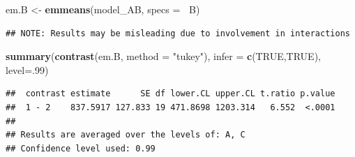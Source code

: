 \documentclass[12pt,]{article}
\newenvironment{Shaded}{\begin{snugshade}}{\end{snugshade}}
\newcommand{\KeywordTok}[1]{\textcolor[rgb]{0.13,0.29,0.53}{\textbf{#1}}}
\newcommand{\DataTypeTok}[1]{\textcolor[rgb]{0.13,0.29,0.53}{#1}}
\newcommand{\DecValTok}[1]{\textcolor[rgb]{0.00,0.00,0.81}{#1}}
\newcommand{\StringTok}[1]{\textcolor[rgb]{0.31,0.60,0.02}{#1}}
\newcommand{\OtherTok}[1]{\textcolor[rgb]{0.56,0.35,0.01}{#1}}
\newcommand{\OperatorTok}[1]{\textcolor[rgb]{0.81,0.36,0.00}{\textbf{#1}}}
\newcommand{\NormalTok}[1]{#1}
\begin{document}
\begin{Shaded}
\begin{Highlighting}[]
\NormalTok{em.B <-}\StringTok{ }\KeywordTok{emmeans}\NormalTok{(model_AB, }\DataTypeTok{specs =} \OperatorTok{~}\NormalTok{B)}
\end{Highlighting}
\end{Shaded}

\begin{verbatim}
## NOTE: Results may be misleading due to involvement in interactions
\end{verbatim}

\begin{Shaded}
\begin{Highlighting}[]
\KeywordTok{summary}\NormalTok{(}\KeywordTok{contrast}\NormalTok{(em.B, }\DataTypeTok{method =} \StringTok{"tukey"}\NormalTok{), }\DataTypeTok{infer =} \KeywordTok{c}\NormalTok{(}\OtherTok{TRUE}\NormalTok{,}\OtherTok{TRUE}\NormalTok{), }\DataTypeTok{level=}\NormalTok{.}\DecValTok{99}\NormalTok{)}
\end{Highlighting}
\end{Shaded}

\begin{verbatim}
##  contrast estimate      SE df lower.CL upper.CL t.ratio p.value
##  1 - 2    837.5917 127.833 19 471.8698 1203.314   6.552  <.0001
## 
## Results are averaged over the levels of: A, C 
## Confidence level used: 0.99
\end{verbatim}
\end{document}
